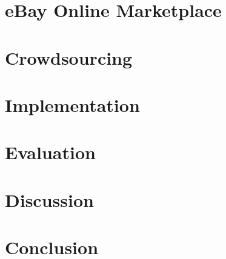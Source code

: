 \documentclass[a4paper]{report}
\begin{document}
\chapter{eBay Online Marketplace}
\label{chap:ebay}


\chapter{Crowdsourcing}
\label{chap:crowdsourcing}


\chapter{Implementation}
\label{chap:implementation}


\chapter{Evaluation}
\label{chap:evaluation}


\chapter{Discussion}
\label{chap:discussion}


\chapter{Conclusion}
\label{chap:conclusion}


\clearpage



\newpage
\clearpage
\begin{appendices}

\end{appendices}

%
\end{document}
